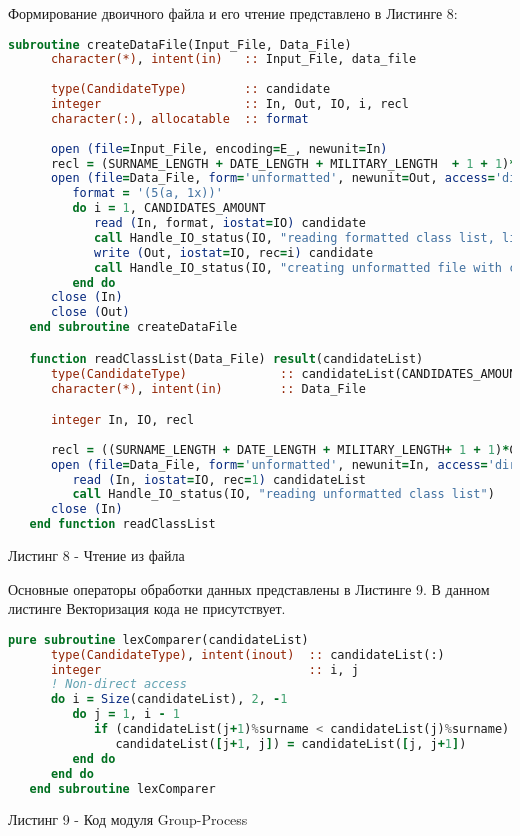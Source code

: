 \documentclass[12pt, a4paper]{report}
\begin{document}
Формирование двоичного файла и его чтение представлено в Листинге 8:
\begin{lstlisting}[language=Fortran]
  subroutine createDataFile(Input_File, Data_File)
      character(*), intent(in)   :: Input_File, data_file
      
      type(CandidateType)        :: candidate
      integer                    :: In, Out, IO, i, recl
      character(:), allocatable  :: format
      
      open (file=Input_File, encoding=E_, newunit=In)
      recl = (SURNAME_LENGTH + DATE_LENGTH + MILITARY_LENGTH  + 1 + 1)*CH_
      open (file=Data_File, form='unformatted', newunit=Out, access='direct', recl=recl)
         format = '(5(a, 1x))'
         do i = 1, CANDIDATES_AMOUNT
            read (In, format, iostat=IO) candidate
            call Handle_IO_status(IO, "reading formatted class list, line " // i)
            write (Out, iostat=IO, rec=i) candidate
            call Handle_IO_status(IO, "creating unformatted file with class list, record " // i)
         end do
      close (In)
      close (Out)
   end subroutine createDataFile

   function readClassList(Data_File) result(candidateList)
      type(CandidateType)             :: candidateList(CANDIDATES_AMOUNT)
      character(*), intent(in)        :: Data_File

      integer In, IO, recl
      
      recl = ((SURNAME_LENGTH + DATE_LENGTH + MILITARY_LENGTH+ 1 + 1)*CH_) * CANDIDATES_AMOUNT
      open (file=Data_File, form='unformatted', newunit=In, access='direct', recl=recl)
         read (In, iostat=IO, rec=1) candidateList
         call Handle_IO_status(IO, "reading unformatted class list")
      close (In)
   end function readClassList
\end{lstlisting}
\begin{center}
Листинг 8 - Чтение из файла
\end{center}

Основные операторы обработки данных представлены в Листинге 9. В данном листинге Векторизация кода не присутствует.
\begin{lstlisting}[language=Fortran]
     pure subroutine lexComparer(candidateList)
      type(CandidateType), intent(inout)  :: candidateList(:)
      integer                             :: i, j
      ! Non-direct access
      do i = Size(candidateList), 2, -1
         do j = 1, i - 1
            if (candidateList(j+1)%surname < candidateList(j)%surname) &
               candidateList([j+1, j]) = candidateList([j, j+1])
         end do
      end do
   end subroutine lexComparer
\end{lstlisting}
\begin{center}
Листинг 9 - Код модуля Group-Process
\end{center}
\newpage
\end{document}
